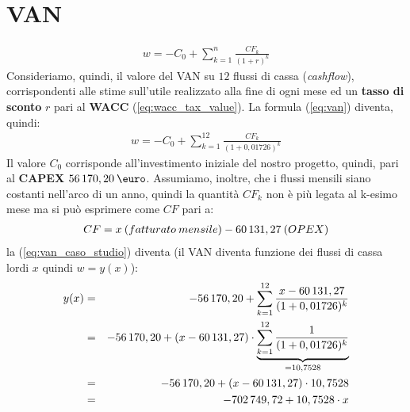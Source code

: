 \section[VAN]{VAN}
	\begin{equation}
	\label{eq:van}
	\begin{split}
 		w = - C_0 + \sum_{k=1}^n \frac{CF_k}{(1+r)^k}
	\end{split}
	\end{equation}
	Consideriamo, quindi, il valore del \ac{VAN} su $12$ flussi di cassa (\textit{cashflow}), corrispondenti alle stime sull'utile realizzato alla fine di ogni mese ed un \textbf{tasso di sconto} $r$ pari al \textbf{\ac{WACC}} (\ref{eq:wacc_tax_value}).\newline
	La formula (\ref{eq:van}) diventa, quindi:	
	\begin{equation}
	\label{eq:van_caso_studio}
	\begin{split}
 		w = - C_0 + \sum_{k=1}^{12} \frac{CF_k}{(1+0,01726)^k}
	\end{split}
	\end{equation}	
	Il valore $C_0$ corrisponde all'investimento iniziale del nostro progetto, quindi, pari al \textbf{CAPEX} $ 56\thinspace 170,20 \: \mbox{\euro}$.
	Assumiamo, inoltre, che i flussi mensili siano costanti nell'arco di un anno, quindi la quantità $CF_k$ non è più legata al k-esimo mese ma si può esprimere come $CF$ pari a:
	\begin{equation}
	\label{eq:flussi_cassa_mensili}
	\begin{split}
 		CF = x \:(fatturato \: mensile) - 60\thinspace 131,27 \: (OPEX)
	\end{split}
	\end{equation}	  	
la (\ref{eq:van_caso_studio}) diventa (il VAN diventa funzione dei flussi di cassa lordi $x$ quindi $w = y(x)$):	
	\begin{eqnarray}
	\label{eq:van_caso_studio_2}
 		y(x) & = & - 56\thinspace 170,20 + \sum_{k=1}^{12} \frac{x - 60\thinspace 131,27}{(1+0,01726)^k} \nonumber \\
 		 & = & -56\thinspace 170,20 + (x - 60\thinspace 131,27) \cdot \underbrace{\sum_{k=1}^{12} \frac{1} {(1+0,01726)^{k}}}_{{}=10,7528} \nonumber \\
 		 & = & -56\thinspace 170,20 + (x - 60\thinspace 131,27) \cdot 10,7528 \nonumber \\
 		 & = & -702\thinspace 749,72 + 10,7528 \cdot x 		
	\end{eqnarray}  		

